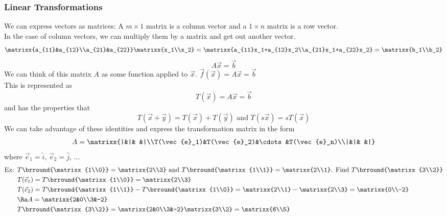 \subsubsection{Linear Transformations}
We can express vectors as matrices: A $m\times 1$ matrix is a column vector and a $1\times n$ matrix is a row vector.\\
In the case of column vectors, we can multiply them by a matrix and get out another vector.
$$\matrixx{a_{11}&a_{12}\\a_{21}&a_{22}}\matrixx{x_1\\x_2}=\matrixx{a_{11}x_1+a_{12}x_2\\a_{21}x_1+a_{22}x_2}=\matrixx{b_1\\b_2}$$
$$A\vec{x}=\vec{b}$$
We can think of this matrix $A$ as some function applied to $\vec{x}$. $\vec{f}(\vec{x})=A\vec{x}=\vec{b}$\\
This is represented as
$$T(\vec{x})=A\vec{x}=\vec{b}$$
and has the properties that
$$T(\vec{x}+\vec{y})=T(\vec{x})+T(\vec{y})\text{ and }T(s\vec{x})=sT(\vec{x})$$
We can take advantage of these identities and express the transformation matrix in the form
$$A=\matrixx{|&|& &|\\T(\vec{e}_1)&T(\vec{e}_2)&\cdots&T(\vec{e}_n)\\|&|& &|}$$
where $\vec{e}_1=\hat{i},\,\vec{e}_2=\hat{j},\,\ldots$
\begin{align*}
    \text{Ex: }&T\brround{\matrixx{1\\0}}=\matrixx{2\\3}\text{ and }T\brround{\matrixx{1\\1}}=\matrixx{2\\1}\text{. Find }T\brround{\matrixx{3\\2}}\\
    &T(\vec{e}_1)=T\brround{\matrixx{1\\0}}=\matrixx{2\\3}\\
    &T(\vec{e}_2)=T\brround{\matrixx{1\\1}}-T\brround{\matrixx{1\\0}}=\matrixx{2\\1}-\matrixx{2\\3}=\matrixx{0\\-2}\\
    &\Ra A=\matrixx{2&0\\3&-2}\\
    &T\brround{\matrixx{3\\2}}=\matrixx{2&0\\3&-2}\matrixx{3\\2}=\matrixx{6\\5}
\end{align*}
